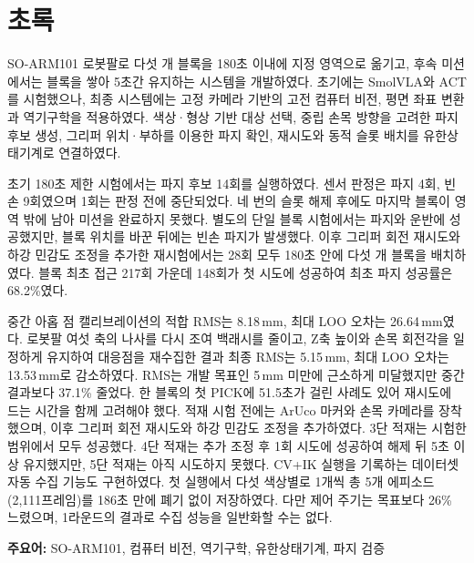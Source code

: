 \chapter*{초록}
\thispagestyle{plain}
SO-ARM101 로봇팔로 다섯 개 블록을 180초 이내에 지정 영역으로 옮기고, 후속 미션에서는 블록을 쌓아 5초간 유지하는 시스템을 개발하였다. 초기에는 SmolVLA와 ACT를 시험했으나, 최종 시스템에는 고정 카메라 기반의 고전 컴퓨터 비전, 평면 좌표 변환과 역기구학을 적용하였다. 색상·형상 기반 대상 선택, 중립 손목 방향을 고려한 파지 후보 생성, 그리퍼 위치·부하를 이용한 파지 확인, 재시도와 동적 슬롯 배치를 유한상태기계로 연결하였다.

초기 180초 제한 시험에서는 파지 후보 14회를 실행하였다. 센서 판정은 파지 4회, 빈손 9회였으며 1회는 판정 전에 중단되었다. 네 번의 슬롯 해제 후에도 마지막 블록이 영역 밖에 남아 미션을 완료하지 못했다. 별도의 단일 블록 시험에서는 파지와 운반에 성공했지만, 블록 위치를 바꾼 뒤에는 빈손 파지가 발생했다. 이후 그리퍼 회전 재시도와 하강 민감도 조정을 추가한 재시험에서는 28회 모두 180초 안에 다섯 개 블록을 배치하였다. 블록 최초 접근 217회 가운데 148회가 첫 시도에 성공하여 최초 파지 성공률은 68.2\%였다.

중간 아홉 점 캘리브레이션의 적합 RMS는 8.18\,mm, 최대 LOO 오차는 26.64\,mm였다. 로봇팔 여섯 축의 나사를 다시 조여 백래시를 줄이고, Z축 높이와 손목 회전각을 일정하게 유지하여 대응점을 재수집한 결과 최종 RMS는 5.15\,mm, 최대 LOO 오차는 13.53\,mm로 감소하였다. RMS는 개발 목표인 5\,mm 미만에 근소하게 미달했지만 중간 결과보다 37.1\% 줄었다. 한 블록의 첫 PICK에 51.5초가 걸린 사례도 있어 재시도에 드는 시간을 함께 고려해야 했다. 적재 시험 전에는 ArUco 마커와 손목 카메라를 장착했으며, 이후 그리퍼 회전 재시도와 하강 민감도 조정을 추가하였다. 3단 적재는 시험한 범위에서 모두 성공했다. 4단 적재는 추가 조정 후 1회 시도에 성공하여 해제 뒤 5초 이상 유지했지만, 5단 적재는 아직 시도하지 못했다. CV+IK 실행을 기록하는 데이터셋 자동 수집 기능도 구현하였다. 첫 실행에서 다섯 색상별로 1개씩 총 5개 에피소드(2{,}111프레임)를 186초 만에 폐기 없이 저장하였다. 다만 제어 주기는 목표보다 26\% 느렸으며, 1라운드의 결과로 수집 성능을 일반화할 수는 없다.

\medskip
\noindent\textbf{주요어:} SO-ARM101, 컴퓨터 비전, 역기구학, 유한상태기계, 파지 검증
